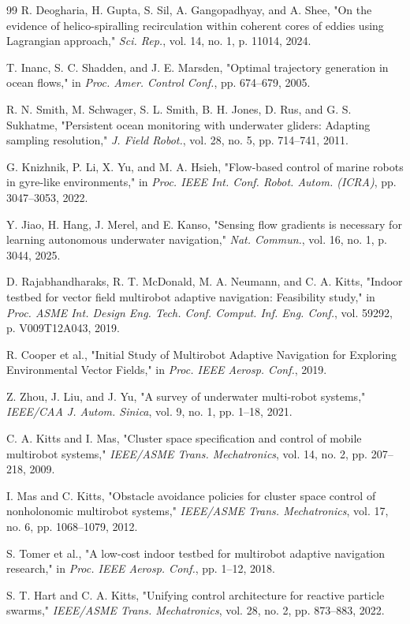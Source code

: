 \documentclass[lettersize,journal]{IEEEtran}
\begin{document}
\begin{thebibliography}{99}
 R. Deogharia, H. Gupta, S. Sil, A. Gangopadhyay, and A. Shee, "On the evidence of helico-spiralling recirculation within coherent cores of eddies using Lagrangian approach," \textit{Sci. Rep.}, vol. 14, no. 1, p. 11014, 2024.

 T. Inanc, S. C. Shadden, and J. E. Marsden, "Optimal trajectory generation in ocean flows," in \textit{Proc. Amer. Control Conf.}, pp. 674--679, 2005.

 R. N. Smith, M. Schwager, S. L. Smith, B. H. Jones, D. Rus, and G. S. Sukhatme, "Persistent ocean monitoring with underwater gliders: Adapting sampling resolution," \textit{J. Field Robot.}, vol. 28, no. 5, pp. 714--741, 2011.

 G. Knizhnik, P. Li, X. Yu, and M. A. Hsieh, "Flow-based control of marine robots in gyre-like environments," in \textit{Proc. IEEE Int. Conf. Robot. Autom. (ICRA)}, pp. 3047--3053, 2022.

 Y. Jiao, H. Hang, J. Merel, and E. Kanso, "Sensing flow gradients is necessary for learning autonomous underwater navigation," \textit{Nat. Commun.}, vol. 16, no. 1, p. 3044, 2025.

 D. Rajabhandharaks, R. T. McDonald, M. A. Neumann, and C. A. Kitts, "Indoor testbed for vector field multirobot adaptive navigation: Feasibility study," in \textit{Proc. ASME Int. Design Eng. Tech. Conf. Comput. Inf. Eng. Conf.}, vol. 59292, p. V009T12A043, 2019.

 R. Cooper et al., "Initial Study of Multirobot Adaptive Navigation for Exploring Environmental Vector Fields," in \textit{Proc. IEEE Aerosp. Conf.}, 2019.

 Z. Zhou, J. Liu, and J. Yu, "A survey of underwater multi-robot systems," \textit{IEEE/CAA J. Autom. Sinica}, vol. 9, no. 1, pp. 1--18, 2021.

 C. A. Kitts and I. Mas, "Cluster space specification and control of mobile multirobot systems," \textit{IEEE/ASME Trans. Mechatronics}, vol. 14, no. 2, pp. 207--218, 2009.

 I. Mas and C. Kitts, "Obstacle avoidance policies for cluster space control of nonholonomic multirobot systems," \textit{IEEE/ASME Trans. Mechatronics}, vol. 17, no. 6, pp. 1068--1079, 2012.

 S. Tomer et al., "A low-cost indoor testbed for multirobot adaptive navigation research," in \textit{Proc. IEEE Aerosp. Conf.}, pp. 1--12, 2018.

 S. T. Hart and C. A. Kitts, "Unifying control architecture for reactive particle swarms," \textit{IEEE/ASME Trans. Mechatronics}, vol. 28, no. 2, pp. 873--883, 2022.

\end{thebibliography}
\end{document}
